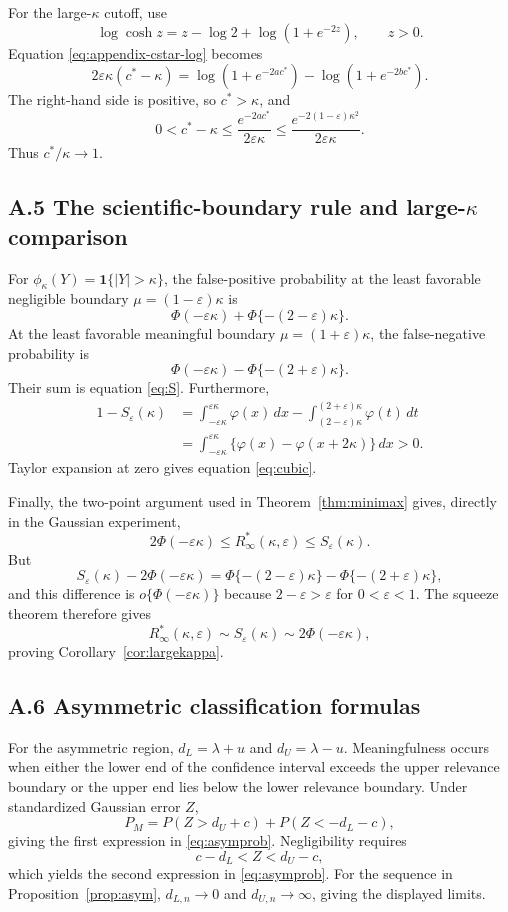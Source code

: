 \documentclass[11pt]{article}
\theoremstyle{remark}
\begin{document}
For the large-$\kappa$ cutoff, use
\[
\log\cosh z=z-\log2+\log(1+e^{-2z}),\qquad z>0.
\]
Equation \eqref{eq:appendix-cstar-log} becomes
\[
2\varepsilon\kappa(c^*-\kappa)
=
\log(1+e^{-2ac^*})-\log(1+e^{-2bc^*}).
\]
The right-hand side is positive, so $c^*>\kappa$, and
\[
0<c^*-\kappa
\le
\frac{e^{-2ac^*}}{2\varepsilon\kappa}
\le
\frac{e^{-2(1-\varepsilon)\kappa^2}}{2\varepsilon\kappa}.
\]
Thus $c^*/\kappa\to1$.

\subsection*{A.5 The scientific-boundary rule and large-$\kappa$ comparison}

For $\phi_\kappa(Y)=\mathbf1\{|Y|>\kappa\}$, the false-positive probability at the least favorable negligible boundary $\mu=(1-\varepsilon)\kappa$ is
\[
\Phi(-\varepsilon\kappa)+\Phi\{-(2-\varepsilon)\kappa\}.
\]
At the least favorable meaningful boundary $\mu=(1+\varepsilon)\kappa$, the false-negative probability is
\[
\Phi(-\varepsilon\kappa)-\Phi\{-(2+\varepsilon)\kappa\}.
\]
Their sum is equation \eqref{eq:S}. Furthermore,
\[
\begin{aligned}
1-S_\varepsilon(\kappa)
&=
\int_{-\varepsilon\kappa}^{\varepsilon\kappa}\varphi(x)\,dx
-
\int_{(2-\varepsilon)\kappa}^{(2+\varepsilon)\kappa}\varphi(t)\,dt\\
&=
\int_{-\varepsilon\kappa}^{\varepsilon\kappa}
\{\varphi(x)-\varphi(x+2\kappa)\}\,dx>0.
\end{aligned}
\]
Taylor expansion at zero gives equation \eqref{eq:cubic}.

Finally, the two-point argument used in Theorem~\ref{thm:minimax} gives, directly in the Gaussian experiment,
\[
2\Phi(-\varepsilon\kappa)
\le R_\infty^*(\kappa,\varepsilon)
\le S_\varepsilon(\kappa).
\]
But
\[
S_\varepsilon(\kappa)-2\Phi(-\varepsilon\kappa)
=
\Phi\{-(2-\varepsilon)\kappa\}
-
\Phi\{-(2+\varepsilon)\kappa\},
\]
and this difference is $o\{\Phi(-\varepsilon\kappa)\}$ because $2-\varepsilon>\varepsilon$ for $0<\varepsilon<1$. The squeeze theorem therefore gives
\[
R_\infty^*(\kappa,\varepsilon)
\sim S_\varepsilon(\kappa)
\sim2\Phi(-\varepsilon\kappa),
\]
proving Corollary~\ref{cor:largekappa}.

\subsection*{A.6 Asymmetric classification formulas}

For the asymmetric region, $d_L=\lambda+u$ and $d_U=\lambda-u$. Meaningfulness occurs when either the lower end of the confidence interval exceeds the upper relevance boundary or the upper end lies below the lower relevance boundary. Under standardized Gaussian error $Z$,
\[
P_M=P(Z>d_U+c)+P(Z<-d_L-c),
\]
giving the first expression in \eqref{eq:asymprob}. Negligibility requires
\[
c-d_L<Z<d_U-c,
\]
which yields the second expression in \eqref{eq:asymprob}. For the sequence in Proposition~\ref{prop:asym}, $d_{L,n}\to0$ and $d_{U,n}\to\infty$, giving the displayed limits.
\end{document}

